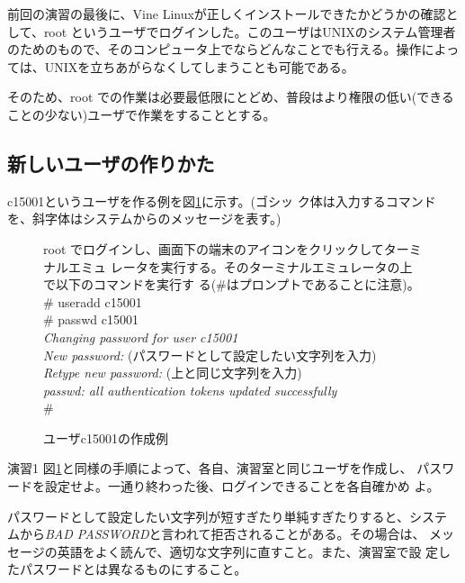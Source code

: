 \documentclass[a4j,10pt]{jarticle}
\begin{document}
前回の演習の最後に、Vine Linuxが正しくインストールできたかどうかの確認と
して、root というユーザでログインした。このユーザはUNIXのシステム管理者
のためのもので、そのコンピュータ上でならどんなことでも行える。操作によっ
ては、UNIXを立ちあがらなくしてしまうことも可能である。

そのため、root での作業は必要最低限にとどめ、普段はより権限の低い(できる
ことの少ない)ユーザで作業をすることとする。

\subsection{新しいユーザの作りかた}

{\sffamily c15001}というユーザを作る例を図\ref{fig:useradd}に示す。(ゴシッ
ク体は入力するコマンドを、斜字体はシステムからのメッセージを表す。)

\begin{figure}[htbp]
\begin{screen}
 root でログインし、画面下の端末のアイコンをクリックしてターミナルエミュ
 レータを実行する。そのターミナルエミュレータの上で以下のコマンドを実行す
 る(\#はプロンプトであることに注意)。\\
 {\sffamily \# useradd c15001}\\
 {\sffamily \# passwd c15001}\\
 {\itshape Changing password for user c15001}\\
 {\itshape New password:} (パスワードとして設定したい文字列を入力)\\
 {\itshape Retype new password:} (上と同じ文字列を入力)\\
 {\itshape passwd: all authentication tokens updated successfully}\\
 {\sffamily \#}
\end{screen}
\caption{ユーザc15001の作成例}\label{fig:useradd}
\end{figure}

\begin{itembox}{演習1}
 図\ref{fig:useradd}と同様の手順によって、各自、演習室と同じユーザを作成し、
 パスワードを設定せよ。一通り終わった後、ログインできることを各自確かめ
 よ。

 パスワードとして設定したい文字列が短すぎたり単純すぎたりすると、システ
 ムから{\itshape BAD PASSWORD}と言われて拒否されることがある。その場合は、
 メッセージの英語をよく読んで、適切な文字列に直すこと。また、演習室で設
 定したパスワードとは異なるものにすること。
\end{itembox}
\end{document}
